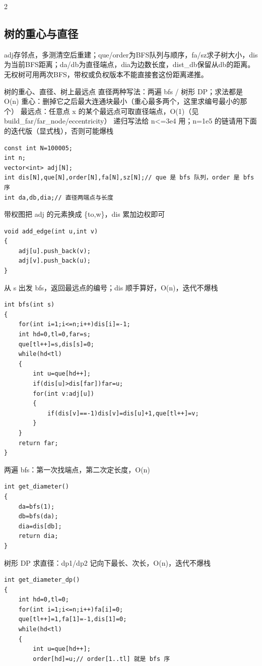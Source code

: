 \documentclass[UTF8,fontset=fandol,a4paper,twoside]{ctexart}
\newcommand{\note}[1]{{\fontsize{10}{12}\selectfont #1\par}}
\begin{document}
\begin{multicols}{2}
\subsection{树的重心与直径}

\note{adj存邻点，多测清空后重建；que/\allowbreak{}order为BFS队列与顺序，fa/\allowbreak{}sz求子树大小，dis为当前BFS距离；da/\allowbreak{}db为直径端点，dia为边数长度，dist\_db保留从db的距离。无权树可用两次BFS，带权或负权版本不能直接套这份距离递推。}
\note{树的重心、直径、树上最远点 直径两种写法：两遍 bfs /\allowbreak{} 树形 DP；求法都是 O(\allowbreak{}n)\allowbreak{} 重心：删掉它之后最大连通块最小（重心最多两个，这里求编号最小的那个） 最远点：任意点 x 的某个最远点可取直径端点，O(\allowbreak{}1)\allowbreak{}（见 build\_far/\allowbreak{}far\_node/\allowbreak{}eccentricity） 递归写法给 n<\allowbreak{}=\allowbreak{}3e4 用；n=\allowbreak{}1e5 的链请用下面的迭代版（显式栈），否则可能爆栈}
\begin{lstlisting}
const int N=100005;
int n;
vector<int> adj[N];
int dis[N],que[N],order[N],fa[N],sz[N];// que 是 bfs 队列，order 是 bfs 序
int da,db,dia;// 直径两端点与长度
\end{lstlisting}
\note{带权图把 adj 的元素换成 \{to,\allowbreak{}w\}，dis 累加边权即可}
\begin{lstlisting}
void add_edge(int u,int v)
{
    adj[u].push_back(v);
    adj[v].push_back(u);
}
\end{lstlisting}
\note{从 s 出发 bfs，返回最远点的编号；dis 顺手算好，O(\allowbreak{}n)\allowbreak{}，迭代不爆栈}
\begin{lstlisting}
int bfs(int s)
{
    for(int i=1;i<=n;i++)dis[i]=-1;
    int hd=0,tl=0,far=s;
    que[tl++]=s,dis[s]=0;
    while(hd<tl)
    {
        int u=que[hd++];
        if(dis[u]>dis[far])far=u;
        for(int v:adj[u])
        {
            if(dis[v]==-1)dis[v]=dis[u]+1,que[tl++]=v;
        }
    }
    return far;
}
\end{lstlisting}
\note{两遍 bfs：第一次找端点，第二次定长度，O(\allowbreak{}n)\allowbreak{}}
\begin{lstlisting}
int get_diameter()
{
    da=bfs(1);
    db=bfs(da);
    dia=dis[db];
    return dia;
}
\end{lstlisting}
\note{树形 DP 求直径：dp1/\allowbreak{}dp2 记向下最长、次长，O(\allowbreak{}n)\allowbreak{}，迭代不爆栈}
\begin{lstlisting}
int get_diameter_dp()
{
    int hd=0,tl=0;
    for(int i=1;i<=n;i++)fa[i]=0;
    que[tl++]=1,fa[1]=-1,dis[1]=0;
    while(hd<tl)
    {
        int u=que[hd++];
        order[hd]=u;// order[1..tl] 就是 bfs 序

\end{lstlisting}
\end{multicols}
\end{document}
